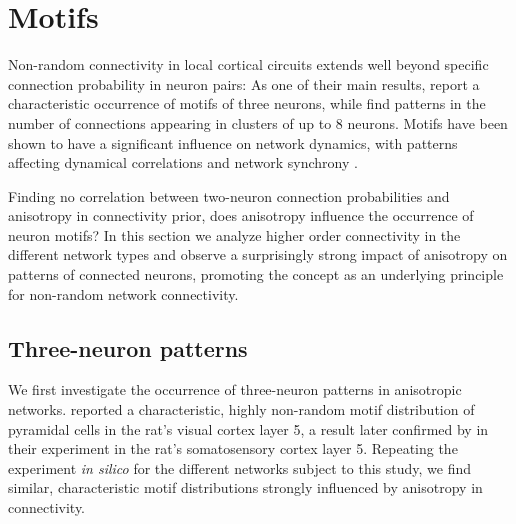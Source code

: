

\section{Motifs}\label{sec:motifs}

Non-random connectivity in local cortical circuits extends well beyond
specific connection probability in neuron pairs: As one of their main
results, \textcite{Song2005} report a characteristic occurrence of
motifs of three neurons, while \textcite{Perin2011} find patterns in
the number of connections appearing in clusters of up to 8
neurons. Motifs have been shown to have a significant influence on
network dynamics, with patterns affecting dynamical
correlations \parencite{Pernice2011} and network
synchrony \parencite{Zhao2011}.

Finding no correlation between two-neuron connection probabilities and
anisotropy in connectivity prior, does anisotropy influence the
occurrence of neuron motifs? In this section we analyze higher order
connectivity in the different network types and observe a surprisingly
strong impact of anisotropy on patterns of connected neurons,
promoting the concept as an underlying principle for non-random
network connectivity.



\subsection*{Three-neuron patterns}

We first investigate the occurrence of three-neuron patterns in
an\-iso\-tro\-pic networks. \textcite{Song2005} reported a
characteristic, highly non-ran\-dom motif distribution of pyramidal
cells in the rat's visual cortex layer 5, a result later confirmed by
\textcite{Perin2011} in their experiment in the rat's somatosensory
cortex layer 5. Repeating the experiment \textit{in silico} for the
different networks subject to this study, we find similar,
characteristic motif distributions strongly influenced by anisotropy
in connectivity.

